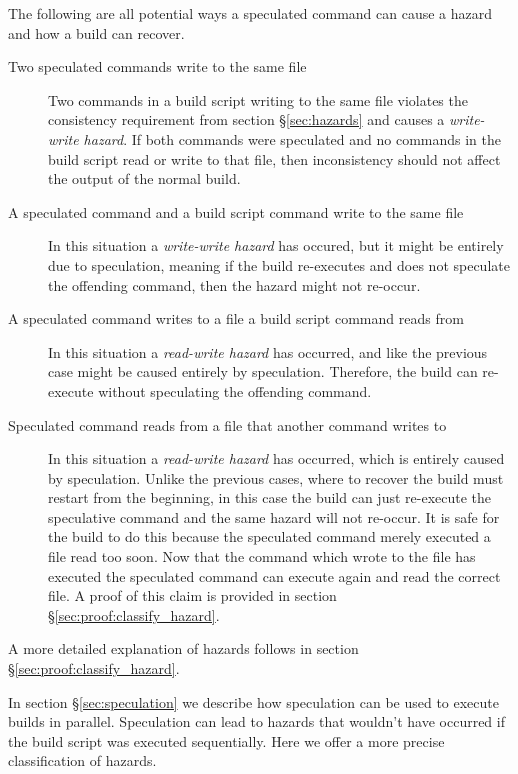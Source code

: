 The following are all potential ways a speculated command can cause a hazard and how a build can recover.

\begin{description}
\item [Two speculated commands write to the same file]
  Two commands in a build script writing to the same file violates the consistency requirement from section \S\ref{sec:hazards} and causes a \emph{write-write hazard}.  If both commands were speculated and no commands in the build script read or write to that file, then inconsistency should not affect the output of the normal build.

\item [A speculated command and a build script command write to the same file]
  In this situation a \emph{write-write hazard} has occured, but it might be entirely due to speculation, meaning if the build re-executes and does not speculate the offending command, then the hazard might not re-occur.

\item [A speculated command writes to a file a build script command reads from]
  In this situation a \emph{read-write hazard} has occurred, and like the previous case might be caused entirely by speculation.  Therefore, the build can re-execute without speculating the offending command.

\item [Speculated command reads from a file that another command writes to]
  In this situation a \emph{read-write hazard} has occurred, which is entirely caused by speculation.  Unlike the previous cases, where to recover the build must restart from the beginning, in this case the build can just re-execute the speculative command and the same hazard will not re-occur.  It is safe for the build to do this because the speculated command merely executed a file read too soon.  Now that the command which wrote to the file has executed the speculated command can execute again and read the correct file.  A proof of this claim is provided in section \S\ref{sec:proof:classify_hazard}.

\end{description}

  A more detailed explanation of hazards follows in section \S\ref{sec:proof:classify_hazard}.



In section \S\ref{sec:speculation} we describe how speculation can be used to execute builds in parallel.  Speculation can lead to hazards that wouldn't have occurred if the build script was executed sequentially. Here we offer a more precise classification of hazards.

